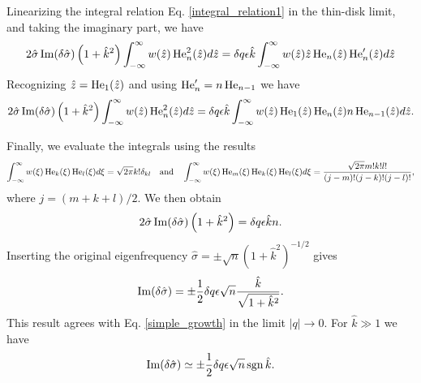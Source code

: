 Linearizing the integral relation Eq. \ref{integral_relation1} in the
thin-disk limit, and taking the
imaginary part, we have
\begin{align}
  2\hat{\sigma}\operatorname{Im}(\delta\hat{\sigma})
  \left(1+\hat{k}^2\right) \int_{-\infty}^{\infty} w(\hat{z})
  \operatorname{He}_n^2(\hat{z}) d\hat{z}
  = \delta q \epsilon \hat{k} 
  \int_{-\infty}^{\infty}
  w(\hat{z})\hat{z}\operatorname{He}_n(\hat{z})\operatorname{He}_n^\prime(\hat{z}) d\hat{z}
\end{align}
Recognizing $\hat{z} = \operatorname{He}_1(\hat{z})$ and using $\operatorname{He}_n^\prime = n
\operatorname{He}_{n-1}$ we have
 \begin{align}
   2\hat{\sigma}\operatorname{Im}(\delta\hat{\sigma})
   \left(1+\hat{k}^2\right) \int_{-\infty}^{\infty} w(\hat{z})
   \operatorname{He}_n^2(\hat{z}) d\hat{z}
   =\delta q \epsilon \hat{k} 
   \int_{-\infty}^{\infty}
   w(\hat{z})\operatorname{He}_1(\hat{z})\operatorname{He}_n(\hat{z})n\operatorname{He}_{n-1}(\hat{z})d\hat{z}. 
 \end{align}

Finally, we evaluate the integrals using the results
\begin{align}
  \int_{-\infty}^{\infty}
  w(\xi) \operatorname{He}_k(\xi)\operatorname{He}_l(\xi) d\xi = \sqrt{2\pi}k!\delta_{kl} \quad
\text{and} \quad
  \int_{-\infty}^{\infty}
  w(\xi) \operatorname{He}_m(\xi)\operatorname{He}_k(\xi)\operatorname{He}_l(\xi) d\xi =
  \frac{\sqrt{2\pi}m!k!l!}{(j-m)!(j-k)!(j-l)!}, 
\end{align}
where $j = (m+k+l)/2$. We then obtain
 \begin{align}
   2\hat{\sigma}\operatorname{Im}(\delta\hat{\sigma})
  \left(1+\hat{k}^2\right) = \delta q \epsilon \hat{k} n.
 \end{align}
Inserting the original eigenfrequency $\hat{\sigma} = \pm
\sqrt{n}(1+\hat{k}^2)^{-1/2}$ gives
\begin{align}
  \operatorname{Im}(\delta\hat{\sigma})= \pm \frac{1}{2}\delta q \epsilon
  \sqrt{n} \frac{\hat{k}}{\sqrt{1+\hat{k}^2}}. 
\end{align}
This result agrees with Eq. \ref{simple_growth} in the limit
$|q|\to0$. 
For $\hat{k}\gg 1$ we have
\begin{align}
  \operatorname{Im}(\delta\hat{\sigma})\simeq \pm \frac{1}{2}\delta q \epsilon
  \sqrt{n} \operatorname{sgn}{\hat{k}}. 
\end{align}





